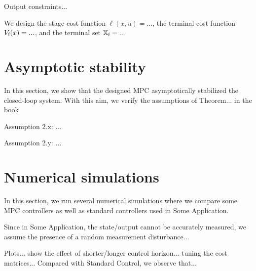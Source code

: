 \documentclass[10pt,twocolumn,twoside]{IEEEtran}
\begin{document}
Output constraints...

We design the stage cost function $\ell(x,u) = ...$, the terminal cost function $V_{\textup{f}}(x) = ...$, and the terminal set $\mathbb{X}_{\textup{f}} = ...$

\section{Asymptotic stability}

In this section, we show that the designed MPC asymptotically stabilized the closed-loop system. With this aim, we verify the assumptions of Theorem... in the book \cite{rawlings:mayne}

Assumption 2.x: ... 

Assumption 2.y: ...


\section{Numerical simulations}

In this section, we run several numerical simulations where we compare some MPC controllers as well as standard controllers used in Some Application.

Since in Some Application, the state/output cannot be accurately measured, we assume the presence of a random measurement disturbance...

Plots... show the effect of shorter/longer control horizon... tuning the cost matrices... Compared with Standard Control, we observe that...




\end{document}
